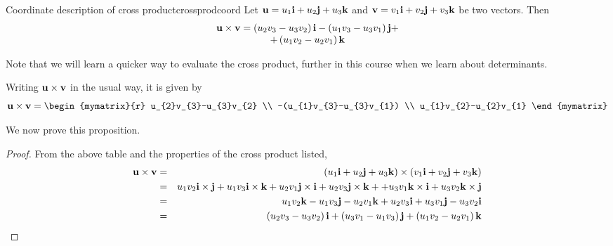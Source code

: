 \begin{proposition}{Coordinate description of cross product}{crossprodcoord}
 Let ${\bf u}=u_{1}{\bf i}+u_{2}{\bf j}+u_{3}{\bf k}$
 and ${\bf v}=v_{1}{\bf i}+v_{2}{\bf j}+v_{3}{\bf k}$ be two
vectors. Then
\begin{equation}
\begin{array}{c}
{\bf u}\times {\bf v} 
 =\left(u_{2}v_{3}-u_{3}v_{2}\right) {\bf i}-\left(
u_{1}v_{3} - u_{3}v_{1}\right) {\bf j}+  \\
 +\left(u_{1}v_{2}-u_{2}v_{1}\right) {\bf k}  \label{crossprod1}
\end{array}
\end{equation}
\end{proposition}

Note that we will learn a quicker way to evaluate the cross product, further in this course when we learn about determinants.

Writing ${\bf u} \times {\bf v}$ in the usual way, it is given by 
\begin{equation*}
\vect{u} \times \vect{v}
=
\begin{mymatrix}{r}
 u_{2}v_{3}-u_{3}v_{2} \\
-(u_{1}v_{3}-u_{3}v_{1}) \\
 u_{1}v_{2}-u_{2}v_{1}
\end{mymatrix}
\end{equation*}

We now prove this proposition. 

\begin{proof} From the above table and the properties of the cross
product listed,
\begin{eqnarray*}
{\bf u} \times {\bf v} &=& \left(u_{1}{\bf i}+u_{2}{\bf j}+u_{3}{\bf k}\right) \times \left(
v_{1}{\bf i}+v_{2}{\bf j}+v_{3}{\bf k}\right) \\
&=& u_{1}v_{2}{\bf i}\times {\bf j}+u_{1}v_{3}{\bf i}\times {\bf k}+u_{2}v_{1}{\bf j}\times {\bf i}+
u_{2}v_{3}{\bf j}\times {\bf k}+
+u_{3}v_{1}{\bf k}\times {\bf i}+u_{3}v_{2}{\bf k}\times {\bf j} \\
&=&u_{1}v_{2}{\bf k}-u_{1}v_{3}{\bf j}-u_{2}v_{1}{\bf k}+u_{2}v_{3}
{\bf i}+u_{3}v_{1}{\bf j}-u_{3}v_{2}{\bf i} \\
&=&\left(u_{2}v_{3}-u_{3}v_{2}\right) {\bf i}+\left(
u_{3}v_{1}-u_{1}v_{3}\right) {\bf j}+\left(u_{1}v_{2}-u_{2}v_{1}\right)
{\bf k}  
\end{eqnarray*}
\begin{equation}
\label{crossprod2}
\end{equation}
\end{proof}

